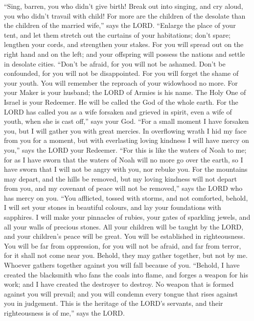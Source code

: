  ``Sing, barren, you who didn't give birth! Break out into
singing, and cry aloud, you who didn't travail with child! For more are
the children of the desolate than the children of the married wife,''
says the LORD.  ``Enlarge the place of your tent, and let
them stretch out the curtains of your habitations; don't spare; lengthen
your cords, and strengthen your stakes.  For you will spread
out on the right hand and on the left; and your offspring will possess
the nations and settle in desolate cities.  ``Don't be
afraid, for you will not be ashamed. Don't be confounded, for you will
not be disappointed. For you will forget the shame of your youth. You
will remember the reproach of your widowhood no more.  For
your Maker is your husband; the LORD of Armies is his name. The Holy One
of Israel is your Redeemer. He will be called the God of the whole
earth.  For the LORD has called you as a wife forsaken and
grieved in spirit, even a wife of youth, when she is cast off,'' says
your God.  ``For a small moment I have forsaken you, but I
will gather you with great mercies.  In overflowing wrath I
hid my face from you for a moment, but with everlasting loving kindness
I will have mercy on you,'' says the LORD your Redeemer. 
``For this is like the waters of Noah to me; for as I have sworn that
the waters of Noah will no more go over the earth, so I have sworn that
I will not be angry with you, nor rebuke you.  For the
mountains may depart, and the hills be removed, but my loving kindness
will not depart from you, and my covenant of peace will not be
removed,'' says the LORD who has mercy on you.  ``You
afflicted, tossed with storms, and not comforted, behold, I will set
your stones in beautiful colours, and lay your foundations with
sapphires.  I will make your pinnacles of rubies, your
gates of sparkling jewels, and all your walls of precious stones.
 All your children will be taught by the LORD, and your
children's peace will be great.  You will be established in
righteousness. You will be far from oppression, for you will not be
afraid, and far from terror, for it shall not come near you.
 Behold, they may gather together, but not by me. Whoever
gathers together against you will fall because of you. 
``Behold, I have created the blacksmith who fans the coals into flame,
and forges a weapon for his work; and I have created the destroyer to
destroy.  No weapon that is formed against you will
prevail; and you will condemn every tongue that rises against you in
judgement. This is the heritage of the LORD's servants, and their
righteousness is of me,'' says the LORD.


